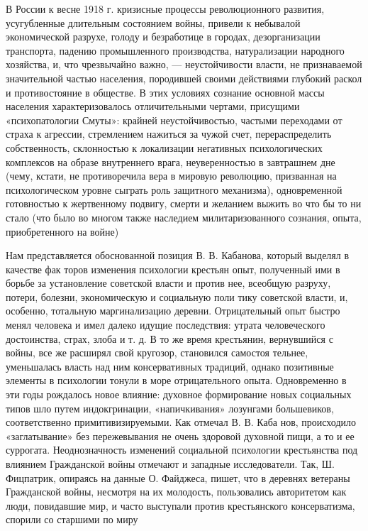 \documentclass{article}
\begin{document}
\hfill

В России к весне 1918 г. кризисные процессы революционного развития, усугубленные длительным состоянием войны, привели к небывалой экономической разрухе, голоду и безработице в городах, дезорганизации транспорта, падению промышленного производства, натурализации народного хозяйства, и, что чрезвычайно важно, — неустойчивости власти, не признаваемой значительной частью населения, породившей своими действиями глубокий раскол и противостояние в обществе. В этих условиях сознание основной массы населения характеризовалось отличительными чертами, присущими «психопатологии Смуты»: крайней неустойчивостью, частыми переходами от страха к агрессии, стремлением нажиться за чужой счет, перераспределить собственность, склонностью к локализации негативных психологических комплексов на образе внутреннего врага, неуверенностью в завтрашнем дне (чему, кстати, не противоречила вера в мировую революцию,
призванная на психологическом уровне сыграть роль защитного механизма), одновременной готовностью к жертвенному подвигу,
смерти и желанием выжить во что бы то ни стало (что было во многом также наследием милитаризованного сознания, опыта, приобретенного на войне)

\hfill

Нам представляется обоснованной позиция В. В. Кабанова, который выделял в качестве фак торов изменения психологии крестьян опыт, полученный ими в борьбе за установление советской власти и против нее, всеобщую разруху, потери, болезни, экономическую и социальную поли тику советской власти, и, особенно, тотальную маргинализацию деревни. Отрицательный опыт быстро менял человека и имел далеко идущие последствия: утрата человеческого достоинства, страх, злоба и т. д. В то же время крестьянин, вернувшийся с войны, все же расширял свой кругозор, становился самостоя тельнее, уменьшалась власть над ним консервативных традиций, однако позитивные элементы в психологии тонули в море отрицательного опыта. Одновременно в эти годы рождалось новое влияние: духовное формирование новых социальных типов шло путем индокгринации, «напичкивания» лозунгами большевиков, соответственно примитивизируемыми. Как отмечал В. В. Каба нов, происходило «заглатывание» без пережевывания не очень здоровой духовной пищи, а то и ее суррогата. Неоднозначность изменений социальной психологии крестьянства под влиянием Гражданской войны отмечают и западные исследователи. Так, Ш. Фицпатрик, опираясь на данные О. Файджеса, пишет, что в деревнях ветераны Гражданской войны, несмотря на их молодость, пользовались авторитетом как люди, повидавшие мир, и часто выступали против крестьянского консерватизма, спорили со старшими по миру
\end{document}
